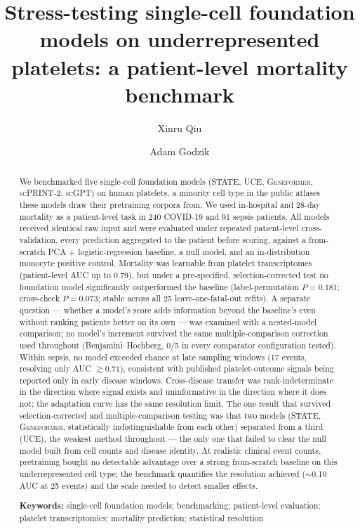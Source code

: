 \documentclass[11pt,a4paper]{article}
\title{Stress-testing single-cell foundation models on underrepresented
platelets: a patient-level mortality benchmark}
\author[1]{Xinru Qiu}
\author[1]{Adam Godzik}
\affil[1]{Division of Biomedical Sciences, School of Medicine, University of California, Riverside, CA, USA}
\date{}
\newcommand{\model}[1]{\textsc{#1}}
\begin{document}
\maketitle

\begin{abstract}
We benchmarked five single-cell foundation models (\model{STATE}, \model{UCE},
\model{Geneformer}, \model{scPRINT-2}, \model{scGPT}) on human platelets, a
minority cell type in the public atlases these models draw their pretraining
corpora from. We used in-hospital and 28-day mortality as a patient-level task
in 240 COVID-19 and 91 sepsis patients. All models received identical raw
input and were evaluated under repeated patient-level cross-validation, every
prediction aggregated to the patient before scoring, against a from-scratch
PCA + logistic-regression baseline, a null model, and an in-distribution
monocyte positive control. Mortality was learnable from platelet
transcriptomes (patient-level AUC up to 0.79), but under a pre-specified,
selection-corrected test no foundation model significantly outperformed the
baseline (label-permutation $P = 0.181$; cross-check $P = 0.073$; stable
across all 25 leave-one-fatal-out refits). A separate question --- whether a
model's score adds information beyond the baseline's even without ranking
patients better on its own --- was examined with a nested-model comparison; no
model's increment survived the same multiple-comparison correction used
throughout (Benjamini--Hochberg, 0/5 in every comparator configuration
tested). Within sepsis, no model exceeded chance at late sampling windows (17
events, resolving only AUC $\gtrsim 0.71$), consistent with published
platelet-outcome signals being reported only in early disease windows.
Cross-disease transfer was rank-indeterminate in the direction where signal
exists and uninformative in the direction where it does not; the adaptation
curve has the same resolution limit. The one result that survived
selection-corrected and multiple-comparison testing was that two models
(\model{STATE}, \model{Geneformer}, statistically indistinguishable from each
other) separated from a third (\model{UCE}), the weakest method throughout ---
the only one that failed to clear the null model built from cell counts and
disease identity. At realistic clinical event counts, pretraining bought no
detectable advantage over a strong from-scratch baseline on this
underrepresented cell type; the benchmark quantifies the resolution achieved
($\sim$0.10 AUC at 25 events) and the scale needed to detect smaller effects.

\textbf{Keywords:} single-cell foundation models; benchmarking; patient-level
evaluation; platelet transcriptomics; mortality prediction; statistical
resolution
\end{abstract}
\end{document}
